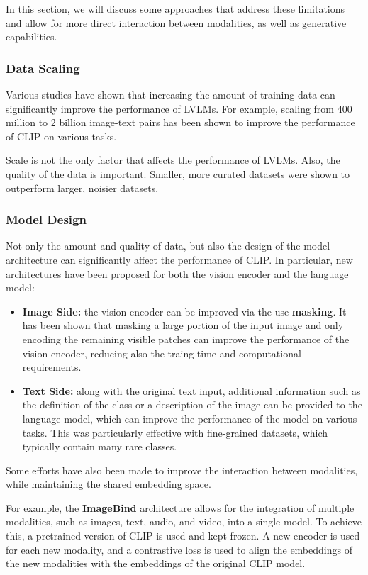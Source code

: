 In this section, we will discuss some approaches that address these limitations and allow for more direct interaction between modalities, as well as generative capabilities.

\subsubsection{Data Scaling}
Various studies have shown that increasing the amount of training data can significantly improve the performance of LVLMs.
For example, scaling from 400 million to 2 billion image-text pairs has been shown to improve the performance of CLIP on various tasks.

Scale is not the only factor that affects the performance of LVLMs. Also, the quality of the data is important. 
Smaller, more curated datasets were shown to outperform larger, noisier datasets.

\subsubsection{Model Design}
Not only the amount and quality of data, but also the design of the model architecture can significantly affect the performance of CLIP.
In particular, new architectures have been proposed for both the vision encoder and the language model:

\begin{itemize}
    \item \textbf{Image Side:} the vision encoder can be improved via the use \textbf{masking}. 
    It has been shown that masking a large portion of the input image and only encoding the remaining visible patches
    can improve the performance of the vision encoder, reducing also the traing time and computational requirements.

    \item \textbf{Text Side:} along with the original text input, additional information such as the definition of the class or a description of the image can be provided to the language model, 
    which can improve the performance of the model on various tasks. This was particularly effective with fine-grained datasets, which typically contain many rare classes.
\end{itemize}

Some efforts have also been made to improve the interaction between modalities, while maintaining the shared embedding space.

For example, the \textbf{ImageBind} architecture allows for the integration of multiple modalities, such as images, text, audio, and video, into a single model.
To achieve this, a pretrained version of CLIP is used and kept frozen. A new encoder is used for each new modality, 
and a contrastive loss is used to align the embeddings of the new modalities with the embeddings of the original CLIP model.

